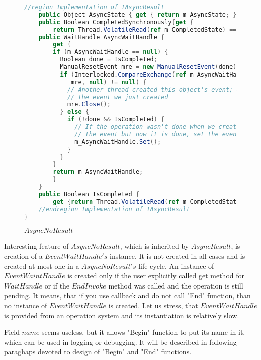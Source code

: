 \begin{figure}[!hbp]
\begin{lstlisting}[language=cs]
	//region Implementation of IAsyncResult
	public Object AsyncState { get { return m_AsyncState; } }
	public Boolean CompletedSynchronously{get { 
		return Thread.VolatileRead(ref m_CompletedState) ==  ic_scs; }}
	public WaitHandle AsyncWaitHandle {
	    get {
		if (m_AsyncWaitHandle == null) {
		  Boolean done = IsCompleted;
		  ManualResetEvent mre = new ManualResetEvent(done);
		  if (Interlocked.CompareExchange(ref m_AsyncWaitHandle,
		     mre, null) != null) {
		    // Another thread created this object's event; dispose 
		    // the event we just created
		    mre.Close();
		  } else {
		    if (!done && IsCompleted) {
		      // If the operation wasn't done when we created 
		      // the event but now it is done, set the event
		      m_AsyncWaitHandle.Set();
		    }
		  }
		}
		return m_AsyncWaitHandle;
	    }
	}
	public Boolean IsCompleted {
		get {return Thread.VolatileRead(ref m_CompletedState) != c_sp; }}
	//endregion Implementation of IAsyncResult
}
\end{lstlisting}
\caption{$AsyncNoResult$} \label{noresult}
\end{figure}


	Interesting feature of $AsyncNoResult$, which is inherited by $AsyncResult$, is creation of a $EventWaitHandle's$ instance.
	It is not created in all cases and is created at most one in a $AsyncNoResult's$ life cycle.
	An instance of $EventWaintHandle$ is created only if the user explicitly called get method for $WaitHandle$ or
	if the $EndInvoke$ method was called and the operation is still pending.
	It means, that if you use callback and do not call "End" function, than no instance of $EventWaitHandle$ is created.
	Let us stress, that $EventWaitHandle$ is provided from an operation system and its instantiation is relatively slow.

	Field $name$ seems useless, but it allows "Begin" function to put its name in it, which can be used in logging or debugging.
	It will be described in following paraghaps devoted to design of "Begin" and "End" functions.

